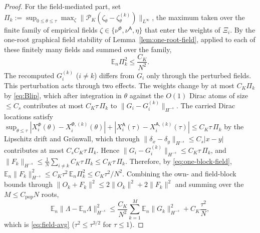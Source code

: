 \documentclass[a4paper,fleqn]{cas-sc}
\theoremstyle{definition}
\theoremstyle{remark}
\begin{document}
\begin{proof}
For the field-mediated part, set
$\Pi_k:=\sup_{0\le\theta\le\tau}\max_{\zeta}\|\mathcal P_K(\zeta_\theta-\zeta^{(k)}_\theta)\|_{L^\infty}$,
the maximum taken over the finite family of empirical fields $\zeta\in\{\nu^\Phi,\nu^{\mathsf A},\eta\}$
that enter the weights of $\Xi_i$. By the one-root graphical field stability of
Lemma~\ref{lem:one-root-field}, applied to each of these finitely many fields and summed over the
family,
\begin{equation}\label{eq:one-block-field}
\mathbb E_n\Pi_k^2\le\frac{C_K}{N^2}.
\end{equation}
The recomputed $G^{(k)}_i$ ($i\ne k$) differs from $G_i$ only through the perturbed fields.
This perturbation acts through two effects. The weights change by at most $C_K\Pi_k$ by \eqref{eq:Blip},
which after integration in $\theta$ against the $O(1)$ Dirac atoms of size $\le C_s$ contributes at most
$C_K\tau\,\Pi_k$ to $\|G_i-G^{(k)}_i\|_{H^{-s}}$. The carried Dirac locations satisfy
$\sup_{\theta\le\tau}|X^\Phi_i(\theta)-X^{\Phi,(k)}_i(\theta)|+|X^{\mathsf A}_i(\tau)-X^{\mathsf A,(k)}_i(\tau)|\le C_K\tau\,\Pi_k$
by the Lipschitz drift and Gr\"onwall, which through $\|\delta_x-\delta_y\|_{H^{-s}}\le C_s|x-y|$ contributes
at most $C_sC_K\tau\,\Pi_k$. Hence $\|G_i-G^{(k)}_i\|_{H^{-s}}\le C_K\tau\,\Pi_k$, and
$\|F_k\|_{H^{-s}}\le\frac1N\sum_{i\ne k}C_K\tau\,\Pi_k\le C_K\tau\,\Pi_k$.
Therefore, by \eqref{eq:one-block-field}, $\mathbb E_n\|F_k\|_{H^{-s}}^2\le C_K\tau^2\,\mathbb E_n\Pi_k^2\le C_K\tau^2/N^2$.
Combining the own- and field-block bounds through $\|O_k+F_k\|^2\le2\|O_k\|^2+2\|F_k\|^2$ and
summing over the $M\le C_{\mathrm{pop}}N$ roots,
\[
\mathbb E_n\|\Lambda-\mathbb E_n\Lambda\|_{H^{-s}}^2
\le\frac{C_K}{N^2}\sum_{k=1}^M\mathbb E_n\|G_k\|_{H^{-s}}^2+C_K\frac{\tau^2}N,
\]
which is \eqref{eq:field-avg} ($\tau^2\le\tau^{3/2}$ for $\tau\le1$).
\end{proof}
\end{document}

